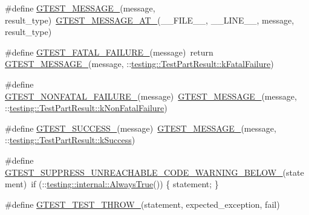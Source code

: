 \begin{DoxyCompactItemize}
\item 
\#define \hyperlink{fused-src_2gtest_2gtest_8h_a94c73d5368ec946bc354d0992ad00810}{\-G\-T\-E\-S\-T\-\_\-\-M\-E\-S\-S\-A\-G\-E\-\_\-}(message, result\-\_\-type)~\hyperlink{gtest-internal_8h_a8d70025c45a47a493780746dfd66d565}{\-G\-T\-E\-S\-T\-\_\-\-M\-E\-S\-S\-A\-G\-E\-\_\-\-A\-T\-\_\-}(\-\_\-\-\_\-\-F\-I\-L\-E\-\_\-\-\_\-, \-\_\-\-\_\-\-L\-I\-N\-E\-\_\-\-\_\-, message, result\-\_\-type)
\item 
\#define \hyperlink{fused-src_2gtest_2gtest_8h_a0f9a4c3ea82cc7bf4478eaffdc168358}{\-G\-T\-E\-S\-T\-\_\-\-F\-A\-T\-A\-L\-\_\-\-F\-A\-I\-L\-U\-R\-E\-\_\-}(message)~return \hyperlink{gtest-internal_8h_a94c73d5368ec946bc354d0992ad00810}{\-G\-T\-E\-S\-T\-\_\-\-M\-E\-S\-S\-A\-G\-E\-\_\-}(message, \-::\hyperlink{classtesting_1_1TestPartResult_a1d1cfd8ffb84e947f82999c682b666a7a902a473edef7eeb3e0499901a220ecfd}{testing\-::\-Test\-Part\-Result\-::k\-Fatal\-Failure})
\item 
\#define \hyperlink{fused-src_2gtest_2gtest_8h_a6cb7482cfa03661a91c698eb5895f642}{\-G\-T\-E\-S\-T\-\_\-\-N\-O\-N\-F\-A\-T\-A\-L\-\_\-\-F\-A\-I\-L\-U\-R\-E\-\_\-}(message)~\hyperlink{gtest-internal_8h_a94c73d5368ec946bc354d0992ad00810}{\-G\-T\-E\-S\-T\-\_\-\-M\-E\-S\-S\-A\-G\-E\-\_\-}(message, \-::\hyperlink{classtesting_1_1TestPartResult_a1d1cfd8ffb84e947f82999c682b666a7af063e8ea6a2c3b8bdccc62a49e1e27a7}{testing\-::\-Test\-Part\-Result\-::k\-Non\-Fatal\-Failure})
\item 
\#define \hyperlink{fused-src_2gtest_2gtest_8h_abe012b550eb3807e8c49f7e161bd1567}{\-G\-T\-E\-S\-T\-\_\-\-S\-U\-C\-C\-E\-S\-S\-\_\-}(message)~\hyperlink{gtest-internal_8h_a94c73d5368ec946bc354d0992ad00810}{\-G\-T\-E\-S\-T\-\_\-\-M\-E\-S\-S\-A\-G\-E\-\_\-}(message, \-::\hyperlink{classtesting_1_1TestPartResult_a1d1cfd8ffb84e947f82999c682b666a7a266017ca395108407d14b7be595574c1}{testing\-::\-Test\-Part\-Result\-::k\-Success})
\item 
\#define \hyperlink{fused-src_2gtest_2gtest_8h_a2e66f7dfc5cb87e0fa0289f653173c69}{\-G\-T\-E\-S\-T\-\_\-\-S\-U\-P\-P\-R\-E\-S\-S\-\_\-\-U\-N\-R\-E\-A\-C\-H\-A\-B\-L\-E\-\_\-\-C\-O\-D\-E\-\_\-\-W\-A\-R\-N\-I\-N\-G\-\_\-\-B\-E\-L\-O\-W\-\_\-}(statement)~if (\-::\hyperlink{namespacetesting_1_1internal_a7b125f3952e08530aedb98a650ee73c1}{testing\-::internal\-::\-Always\-True}()) \{ statement; \}
\item 
\#define \hyperlink{fused-src_2gtest_2gtest_8h_a3f71db93eaf30b0cfca9612b9ac32106}{\-G\-T\-E\-S\-T\-\_\-\-T\-E\-S\-T\-\_\-\-T\-H\-R\-O\-W\-\_\-}(statement, expected\-\_\-exception, fail)

\end{DoxyCompactItemize}

